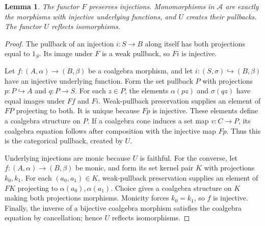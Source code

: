 \documentclass[11pt]{article}
\newtheorem{lemma}[theorem]{Lemma}
\begin{document}
\begin{lemma}\label{lem:coalgebra-monos}
The functor $F$ preserves injections. Monomorphisms in $\mathcal A$ are exactly the morphisms with injective underlying functions, and $U$ creates their pullbacks. The functor $U$ reflects isomorphisms.
\end{lemma}
\begin{proof}
The pullback of an injection $i:S\to B$ along itself has both projections equal to $1_S$. Its image under $F$ is a weak pullback, so $Fi$ is injective.

Let $f:(A,\alpha)\to(B,\beta)$ be a coalgebra morphism, and let $i:(S,\sigma)\hookrightarrow(B,\beta)$ have an injective underlying function. Form the set pullback $P$ with projections $p:P\hookrightarrow A$ and $q:P\to S$. For each $z\in P$, the elements $\alpha(pz)$ and $\sigma(qz)$ have equal images under $Ff$ and $Fi$. Weak-pullback preservation supplies an element of $FP$ projecting to both. It is unique because $Fp$ is injective. These elements define a coalgebra structure on $P$. If a coalgebra cone induces a set map $v:C\to P$, its coalgebra equation follows after composition with the injective map $Fp$. Thus this is the categorical pullback, created by $U$.

Underlying injections are monic because $U$ is faithful. For the converse, let $f:(A,\alpha)\to(B,\beta)$ be monic, and form its set kernel pair $K$ with projections $k_0,k_1$. For each $(a_0,a_1)\in K$, weak-pullback preservation supplies an element of $FK$ projecting to $\alpha(a_0),\alpha(a_1)$. Choice gives a coalgebra structure on $K$ making both projections morphisms. Monicity forces $k_0=k_1$, so $f$ is injective. Finally, the inverse of a bijective coalgebra morphism satisfies the coalgebra equation by cancellation; hence $U$ reflects isomorphisms.
\end{proof}
\end{document}
